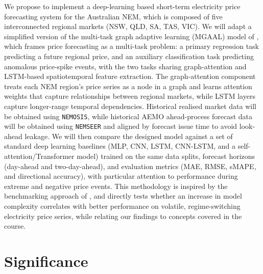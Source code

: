\documentclass[a4paper,11pt]{article} %
\begin{document}
We propose to implement a deep-learning based short-term electricity price forecasting
system for the Australian NEM, which is composed of five interconnected regional markets
(NSW, QLD, SA, TAS, VIC). We will adapt a simplified version of the multi-task graph
adaptive learning (MGAAL) model of \citet{li2025mgaal}, which frames price forecasting
as a multi-task problem: a primary regression task predicting a future regional price,
and an auxiliary classification task predicting anomalous price-spike events, with the
two tasks sharing graph-attention and LSTM-based spatiotemporal feature extraction. The
graph-attention component treats each NEM region's price series as a node in a graph and
learns attention weights that capture relationships between regional markets, while LSTM
layers capture longer-range temporal dependencies. Historical realised market data will
be obtained using \texttt{NEMOSIS}, while historical AEMO ahead-process forecast data
will be obtained using \texttt{NEMSEER} and aligned by forecast issue time to avoid
look-ahead leakage. We will then compare the designed model against a set of standard
deep learning baselines (MLP, CNN, LSTM, CNN-LSTM, and a self-attention/Transformer
model) trained on the same data splits, forecast horizons (day-ahead and two-day-ahead),
and evaluation metrics (MAE, RMSE, sMAPE, and directional accuracy), with particular
attention to performance during extreme and negative price events. This methodology is
inspired by the benchmarking approach of \citet{gani2026deeptime}, and directly tests
whether an increase in model complexity correlates with better performance on volatile,
regime-switching electricity price series, while relating our findings to concepts
covered in the course.

\section{Significance}
\end{document}

